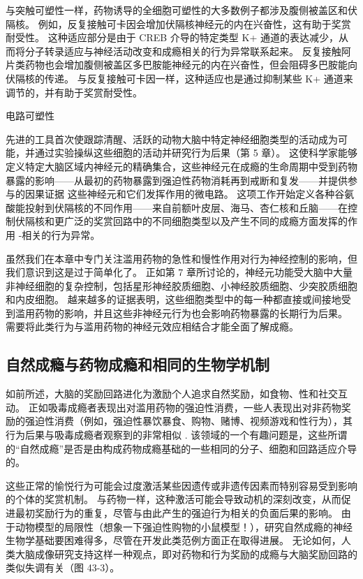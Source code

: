 与突触可塑性一样，药物诱导的全细胞可塑性的大多数例子都涉及腹侧被盖区和伏隔核。 例如，反复接触可卡因会增加伏隔核神经元的内在兴奋性，这有助于奖赏耐受性。 这种适应部分是由于 CREB 介导的特定类型 K+ 通道的表达减少，从而将分子转录适应与神经活动改变和成瘾相关的行为异常联系起来。 反复接触阿片类药物也会增加腹侧被盖区多巴胺能神经元的内在兴奋性，但会阻碍多巴胺能向伏隔核的传递。 与反复接触可卡因一样，这种适应也是通过抑制某些 K+ 通道来调节的，并有助于奖赏耐受性。

电路可塑性

先进的工具首次使跟踪清醒、活跃的动物大脑中特定神经细胞类型的活动成为可能，并通过实验操纵这些细胞的活动并研究行为后果（第 5 章）。 这使科学家能够定义特定大脑区域内神经元的精确集合，这些神经元在成瘾的生命周期中受到药物暴露的影响——从最初的药物暴露到强迫性药物消耗再到戒断和复发——并提供参与的因果证据 这些神经元和它们发挥作用的微电路。 这项工作开始定义各种谷氨酸能投射到伏隔核的不同作用——来自前额叶皮层、海马、杏仁核和丘脑——在控制伏隔核和更广泛的奖赏回路中的不同细胞类型以及产生不同的成瘾方面发挥的作用 -相关的行为异常。

虽然我们在本章中专门关注滥用药物的急性和慢性作用对行为神经控制的影响，但我们意识到这是过于简单化了。 正如第 7 章所讨论的，神经元功能受大脑中大量非神经细胞的复杂控制，包括星形神经胶质细胞、小神经胶质细胞、少突胶质细胞和内皮细胞。 越来越多的证据表明，这些细胞类型中的每一种都直接或间接地受到滥用药物的影响，并且这些非神经元行为也会影响药物暴露的长期行为后果。 需要将此类行为与滥用药物的神经元效应相结合才能全面了解成瘾。

\subsection{自然成瘾与药物成瘾和相同的生物学机制}
如前所述，大脑的奖励回路进化为激励个人追求自然奖励，如食物、性和社交互动。 正如吸毒成瘾者表现出对滥用药物的强迫性消费，一些人表现出对非药物奖励的强迫性消费（例如，强迫性暴饮暴食、购物、赌博、视频游戏和性行为），其行为后果与吸毒成瘾者观察到的非常相似 . 该领域的一个有趣问题是，这些所谓的“自然成瘾”是否是由构成药物成瘾基础的一些相同的分子、细胞和回路适应介导的。

这些正常的愉悦行为可能会过度激活某些因遗传或非遗传因素而特别容易受到影响的个体的奖赏机制。 与药物一样，这种激活可能会导致动机的深刻改变，从而促进最初奖励行为的重复，尽管与由此产生的强迫行为相关的负面后果的影响。 由于动物模型的局限性（想象一下强迫性购物的小鼠模型！），研究自然成瘾的神经生物学基础要困难得多，尽管在开发此类范例方面正在取得进展。 无论如何，人类大脑成像研究支持这样一种观点，即对药物和行为奖励的成瘾与大脑奖励回路的类似失调有关（图 43-3）。


